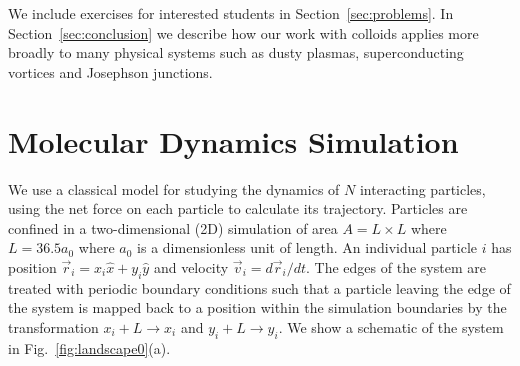 \documentclass[twocolumn,preprintnumbers,amsmath,amssymb,aps,prx]{revtex4}
\begin{document}
We include 
exercises for interested students 
in Section~\ref{sec:problems}.
In Section~\ref{sec:conclusion}
we describe how our work with colloids applies more broadly
to many physical systems
such as dusty plasmas, superconducting vortices and Josephson junctions.





\section{Molecular Dynamics Simulation}
\label{sec:MD}

We use a classical model for 
studying the dynamics of $N$ interacting particles,
using the net force on each particle to calculate
its trajectory.
Particles are confined in a two-dimensional (2D) 
simulation of area $A = L \times L$ where $L=36.5 a_0$
where $a_0$ is a dimensionless unit of length.
An individual particle $i$ has
position $\vec{r}_i = x_i \hat{x} + y_i \hat{y}$
and velocity $\vec{v}_i = d\vec{r}_i/dt$.
The edges of the system are treated with
periodic boundary conditions
such that a particle leaving the edge of the system is mapped
back to a position within the simulation boundaries 
by the transformation $x_i+L \rightarrow x_i$ and $y_i+L \rightarrow y_i$.
We show a schematic of the system in Fig.~\ref{fig:landscape0}(a).
\end{document}
